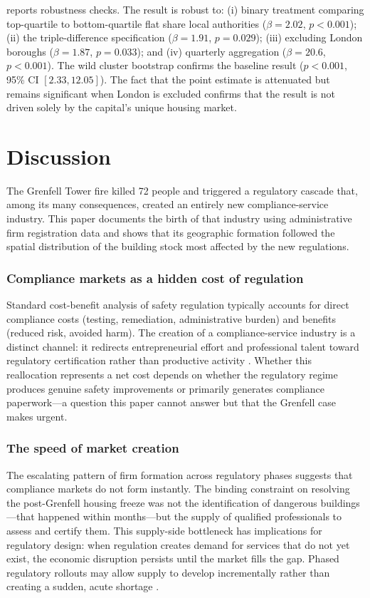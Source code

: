 \documentclass[12pt]{article}
\begin{document}
 reports robustness checks. The result is robust to: (i) binary treatment comparing top-quartile to bottom-quartile flat share local authorities ($\beta = 2.02$, $p < 0.001$); (ii) the triple-difference specification ($\beta = 1.91$, $p = 0.029$); (iii) excluding London boroughs ($\beta = 1.87$, $p = 0.033$); and (iv) quarterly aggregation ($\beta = 20.6$, $p < 0.001$). The wild cluster bootstrap confirms the baseline result ($p < 0.001$, 95\% CI $[2.33, 12.05]$). The fact that the point estimate is attenuated but remains significant when London is excluded confirms that the result is not driven solely by the capital's unique housing market.




\section{Discussion}

The Grenfell Tower fire killed 72 people and triggered a regulatory cascade that, among its many consequences, created an entirely new compliance-service industry. This paper documents the birth of that industry using administrative firm registration data and shows that its geographic formation followed the spatial distribution of the building stock most affected by the new regulations.

\subsubsection*{Compliance markets as a hidden cost of regulation} Standard cost-benefit analysis of safety regulation typically accounts for direct compliance costs (testing, remediation, administrative burden) and benefits (reduced risk, avoided harm). The creation of a compliance-service industry is a distinct channel: it redirects entrepreneurial effort and professional talent toward regulatory certification rather than productive activity \citep{greenstone_2002, greenstone_list_syverson_2012}. Whether this reallocation represents a net cost depends on whether the regulatory regime produces genuine safety improvements or primarily generates compliance paperwork---a question this paper cannot answer but that the Grenfell case makes urgent.

\subsubsection*{The speed of market creation} The escalating pattern of firm formation across regulatory phases suggests that compliance markets do not form instantly. The binding constraint on resolving the post-Grenfell housing freeze was not the identification of dangerous buildings---that happened within months---but the supply of qualified professionals to assess and certify them. This supply-side bottleneck has implications for regulatory design: when regulation creates demand for services that do not yet exist, the economic disruption persists until the market fills the gap. Phased regulatory rollouts may allow supply to develop incrementally rather than creating a sudden, acute shortage \citep{coglianese_lazer_2003, viscusi_2006}.
\end{document}
